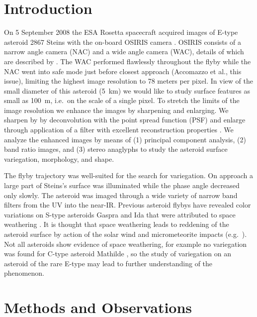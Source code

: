 \documentclass[preprint,3p,authoryear]{elsarticle}
\begin{document}


\section{Introduction}
\label{sec:introduction}

On 5 September 2008 the ESA Rosetta spacecraft acquired images of E-type asteroid 2867 Steins with the on-board OSIRIS camera \citep{K09}. OSIRIS consists of a narrow angle camera (NAC) and a wide angle camera (WAC), details of which are described by \citet{K07}. The WAC performed flawlessly throughout the flyby while the NAC went into safe mode just before closest approach (Accomazzo et al., this issue), limiting the highest image resolution to 78 meters per pixel. In view of the small diameter of this asteroid (5~km) we would like to study surface features as small as 100~m, i.e.\ on the scale of a single pixel. To stretch the limits of the image resolution we enhance the images by sharpening and enlarging. We sharpen by by deconvolution with the point spread function (PSF) and enlarge through application of a filter with excellent reconstruction properties \citep{MN88}. We analyze the enhanced images by means of (1) principal component analysis, (2) band ratio images, and (3) stereo anaglyphs to study the asteroid surface variegation, morphology, and shape.

The flyby trajectory was well-suited for the search for variegation. On approach a large part of Steins's surface was illuminated while the phase angle decreased only slowly. The asteroid was imaged through a wide variety of narrow band filters from the UV into the near-IR. Previous asteroid flybys have revealed color variations on S-type asteroids Gaspra and Ida that were attributed to space weathering \citep{H94,V96}. It is thought that space weathering leads to reddening of the asteroid surface by action of the solar wind and micrometeorite impacts (e.g.\ \citealt{V09}). Not all asteroids show evidence of space weathering, for example no variegation was found for C-type asteroid Mathilde \citep{V97}, so the study of variegation on an asteroid of the rare E-type may lead to further understanding of the phenomenon.


\section{Methods and Observations}
\label{sec:observations}
\end{document}
